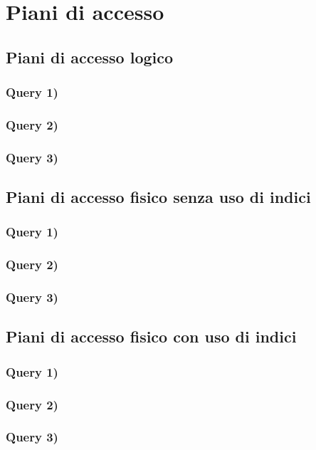 \documentclass[a4paper,12pt]{article}
\begin{document}
 \section{ Piani di accesso }

 \subsection{ Piani di accesso logico }

 \subsubsection{ Query 1) }

 \subsubsection{ Query 2) }

 \subsubsection{ Query 3) }

 \subsection{ Piani di accesso fisico senza uso di indici }

 \subsubsection{ Query 1) }

 \subsubsection{ Query 2) }

 \subsubsection{ Query 3) }

 \subsection{ Piani di accesso fisico con uso di indici }

 \subsubsection{ Query 1) }

 \subsubsection{ Query 2) }

 \subsubsection{ Query 3) }
\end{document}
